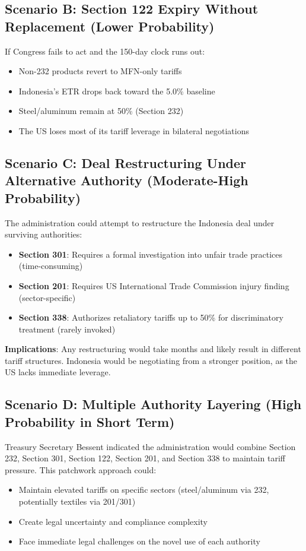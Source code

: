 \documentclass[12pt,a4paper]{article}
\begin{document}
\subsection{Scenario B: Section 122 Expiry Without Replacement (Lower Probability)}

If Congress fails to act and the 150-day clock runs out:
\begin{itemize}
    \item Non-232 products revert to MFN-only tariffs
    \item Indonesia's ETR drops back toward the 5.0\% baseline
    \item Steel/aluminum remain at 50\% (Section 232)
    \item The US loses most of its tariff leverage in bilateral negotiations
\end{itemize}

\subsection{Scenario C: Deal Restructuring Under Alternative Authority (Moderate-High Probability)}

The administration could attempt to restructure the Indonesia deal under surviving authorities:
\begin{itemize}
    \item \textbf{Section 301}: Requires a formal investigation into unfair trade practices (time-consuming)
    \item \textbf{Section 201}: Requires US International Trade Commission injury finding (sector-specific)
    \item \textbf{Section 338}: Authorizes retaliatory tariffs up to 50\% for discriminatory treatment (rarely invoked)
\end{itemize}

\textbf{Implications}: Any restructuring would take months and likely result in different tariff structures. Indonesia would be negotiating from a stronger position, as the US lacks immediate leverage.

\subsection{Scenario D: Multiple Authority Layering (High Probability in Short Term)}

Treasury Secretary Bessent indicated the administration would combine Section 232, Section 301, Section 122, Section 201, and Section 338 to maintain tariff pressure. This patchwork approach could:
\begin{itemize}
    \item Maintain elevated tariffs on specific sectors (steel/aluminum via 232, potentially textiles via 201/301)
    \item Create legal uncertainty and compliance complexity
    \item Face immediate legal challenges on the novel use of each authority
\end{itemize}
\end{document}
